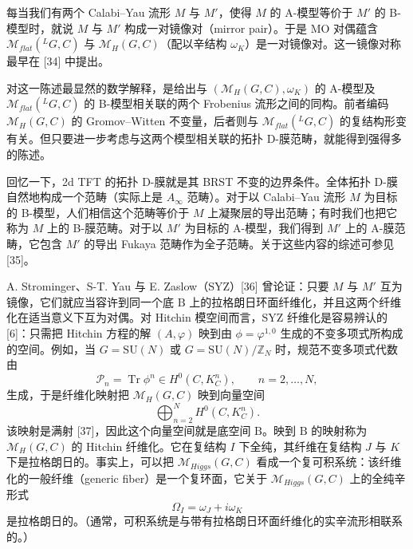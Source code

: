 \documentclass[11pt,a4paper,UTF8]{ctexart}
\begin{document}
每当我们有两个 Calabi–Yau 流形 $M$ 与 $M'$，使得 $M$ 的 A-模型等价于 $M'$ 的 B-模型时，就说 $M$ 与 $M'$ 构成一对镜像对（mirror pair）。于是 MO 对偶蕴含 $\mathcal{M}_{flat}({}^{L}G,C)$ 与 $\mathcal{M}_{H}(G,C)$（配以辛结构 $\omega_{K}$）是一对镜像对。这一镜像对称最早在 [34] 中提出。

对这一陈述最显然的数学解释，是给出与 $(\mathcal{M}_{H}(G,C),\omega_{K})$ 的 A-模型及 $\mathcal{M}_{flat}({}^{L}G,C)$ 的 B-模型相关联的两个 Frobenius 流形之间的同构。前者编码 $\mathcal{M}_{H}(G,C)$ 的 Gromov–Witten 不变量，后者则与 $\mathcal{M}_{flat}({}^{L}G,C)$ 的复结构形变有关。但只要进一步考虑与这两个模型相关联的拓扑 D-膜范畴，就能得到强得多的陈述。



回忆一下，2d TFT 的拓扑 D-膜就是其 BRST 不变的边界条件。全体拓扑 D-膜自然地构成一个范畴（实际上是 $A_{\infty}$ 范畴）。对于以 Calabi–Yau 流形 $M$ 为目标的 B-模型，人们相信这个范畴等价于 $M$ 上凝聚层的导出范畴；有时我们也把它称为 $M$ 上的 B-膜范畴。对于以 $M'$ 为目标的 A-模型，我们得到 $M'$ 上的 A-膜范畴，它包含 $M'$ 的导出 Fukaya 范畴作为全子范畴。关于这些内容的综述可参见 [35]。

A. Strominger、S-T. Yau 与 E. Zaslow（SYZ）[36] 曾论证：只要 $M$ 与 $M'$ 互为镜像，它们就应当容许到同一个底 $\mathrm{B}$ 上的拉格朗日环面纤维化，并且这两个纤维化在适当意义下互为对偶。对 Hitchin 模空间而言，SYZ 纤维化是容易辨认的 [6]：只需把 Hitchin 方程的解 $(A,\varphi)$ 映到由 $\phi=\varphi^{1,0}$ 生成的不变多项式所构成的空间。例如，当 $G=\mathrm{SU}(N)$ 或 $G=\mathrm{SU}(N)/\mathbb{Z}_{N}$ 时，规范不变多项式代数由
\[
    \mathcal{P}_{n}=\operatorname{Tr}\phi^{n}\in H^{0}(C,K_{C}^{n}),\qquad n=2,\ldots,N,
\]
生成，于是纤维化映射把 $\mathcal{M}_{H}(G,C)$ 映到向量空间
\[
    \bigoplus_{n=2}^{N}H^{0}(C,K_{C}^{n}).
\]
该映射是满射 [37]，因此这个向量空间就是底空间 $\mathrm{B}$。映到 $\mathrm{B}$ 的映射称为 $\mathcal{M}_{H}(G,C)$ 的 Hitchin 纤维化。它在复结构 $I$ 下全纯，其纤维在复结构 $J$ 与 $K$ 下是拉格朗日的。事实上，可以把 $\mathcal{M}_{Higgs}(G,C)$ 看成一个复可积系统：该纤维化的一般纤维（generic fiber）是一个复环面，它关于 $\mathcal{M}_{Higgs}(G,C)$ 上的全纯辛形式
\[
    \Omega_{I}=\omega_{J}+i\omega_{K}
\]
是拉格朗日的。（通常，可积系统是与带有拉格朗日环面纤维化的实辛流形相联系的。）
\end{document}
